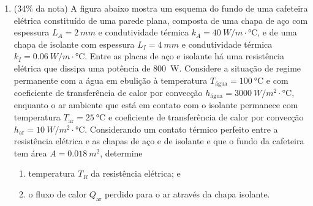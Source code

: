 \documentclass[12pt,a4paper,brazilian]{article}
\newcommand{\ratio}[1]{(#1\% da nota)}
\begin{document}
\begin{enumerate}
    \item \ratio{34} A figura abaixo mostra um esquema do fundo de uma cafeteira 
        elétrica constituído de uma parede plana, composta de uma chapa de aço com
        espessura \(L_A = \SI{2}{mm}\) e condutividade térmica \(k_A = \SI{40}{W/m\cdot\celsius}\),
        e de uma chapa de isolante com espessura \(L_I = \SI{4}{mm}\) e condutividade térmica
        \(k_I = \SI{0.06}{W/m\cdot\celsius}\). Entre as placas de aço e isolante há uma resistência 
        elétrica que dissipa uma potência de \SI{800}{W}. Considere a situação de regime
        permanente com a água em ebulição à temperatura \(T_\text{água}= \SI{100}{\celsius}\) e
        com coeficiente de transferência de calor por convecção \(h_\text{água}=\SI{3000}{W/{m^2}\cdot\celsius}\),
        enquanto o ar ambiente que está em contato com o isolante permanece com temperatura
        \(T_\text{ar} = \SI{25}{\celsius}\) e coeficiente de transferência de calor por
        convecção \(h_\text{ar} = \SI{10}{W/{m^2}\cdot\celsius} \). Considerando um contato térmico 
        perfeito entre a resistência elétrica e as chapas de aço e de isolante e que o fundo da cafeteira
        tem área \(A=\SI{0.018}{m^2}\), determine
        \begin{enumerate}
            \item temperatura \(T_R\) da resistência elétrica; e
            \item o fluxo de calor \(Q_\text{ar}\) perdido para o ar através da chapa
                isolante.

        \end{enumerate}

        \centering
\end{enumerate}
\end{document}
